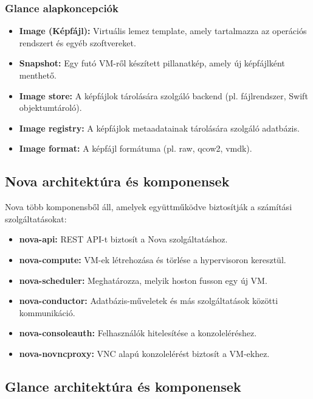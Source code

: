 \documentclass[a4paper,12pt]{article}
\begin{document}
    \subsubsection{Glance alapkoncepciók}

    \begin{itemize}
        \item \textbf{Image (Képfájl):} Virtuális lemez template, amely tartalmazza az operációs rendszert és egyéb szoftvereket.
        \item \textbf{Snapshot:} Egy futó VM-ről készített pillanatkép, amely új képfájlként menthető.
        \item \textbf{Image store:} A képfájlok tárolására szolgáló backend (pl. fájlrendszer, Swift objektumtároló).
        \item \textbf{Image registry:} A képfájlok metaadatainak tárolására szolgáló adatbázis.
        \item \textbf{Image format:} A képfájl formátuma (pl. raw, qcow2, vmdk).
    \end{itemize}

    \subsection{Nova architektúra és komponensek}

    Nova több komponensből áll, amelyek együttműködve biztosítják a számítási szolgáltatásokat:

    \begin{itemize}
        \item \textbf{nova-api:} REST API-t biztosít a Nova szolgáltatáshoz.
        \item \textbf{nova-compute:} VM-ek létrehozása és törlése a hypervisoron keresztül.
        \item \textbf{nova-scheduler:} Meghatározza, melyik hoston fusson egy új VM.
        \item \textbf{nova-conductor:} Adatbázis-műveletek és más szolgáltatások közötti kommunikáció.
        \item \textbf{nova-consoleauth:} Felhasználók hitelesítése a konzoleléréshez.
        \item \textbf{nova-novncproxy:} VNC alapú konzolelérést biztosít a VM-ekhez.
    \end{itemize}

    \subsection{Glance architektúra és komponensek}
\end{document}
